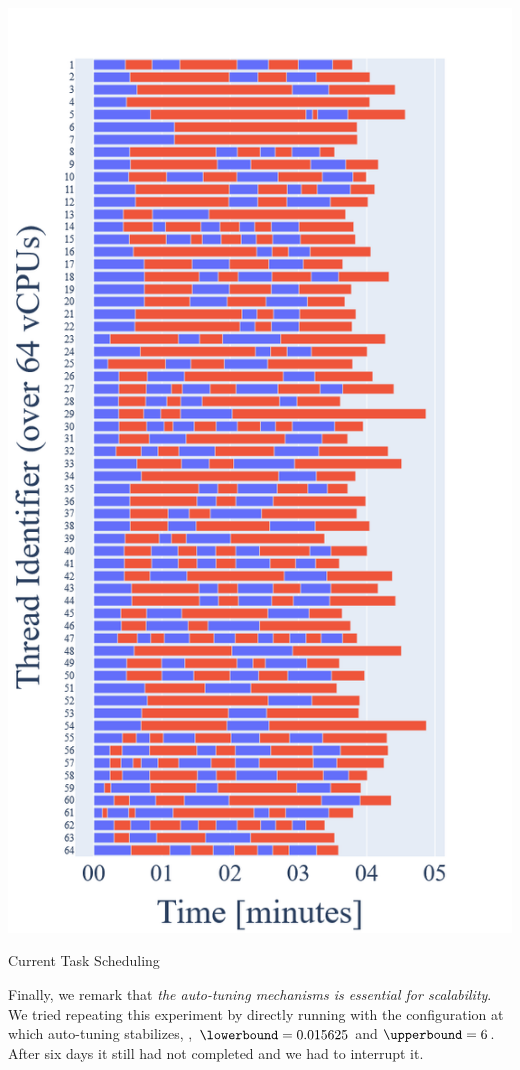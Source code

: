 \begin{marginfigure}[*16]
  \centering
  \includegraphics[width=\textwidth]{figures/new}
  \caption{Current Task Scheduling}
\end{marginfigure}

Finally, we remark that \emph{the auto-tuning mechanisms is essential for scalability}. We tried repeating this experiment by directly
running \libra{} with the configuration at which auto-tuning stabilizes, \ie, $\lowerbound = 0.015625$ and $\upperbound = 6$. After six days it still had not completed and we had to interrupt it.

